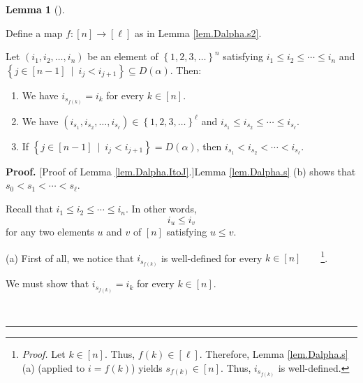 \documentclass[numbers=enddot,12pt,final,onecolumn,notitlepage,abstracton]{scrartcl}
\theoremstyle{definition}
\newtheorem{lem}[theo]{Lemma}
\newenvironment{lemma}[1][]
{\begin{lem}[#1]\begin{leftbar}}
{\end{leftbar}\end{lem}}
\newenvironment{proof}[1][Proof]{\noindent\textbf{#1.} }{\ \rule{0.5em}{0.5em}}
\newenvironment{verlong}{}{}
\begin{document}
\begin{verlong}
\begin{footnotesize}
\begin{lemma}
Define a map $f:\left[  n\right]  \rightarrow\left[  \ell\right]  $ as in
Lemma \ref{lem.Dalpha.s2}.

Let $\left(  i_{1},i_{2},\ldots,i_{n}\right)  $ be an element of $\left\{
1,2,3,\ldots\right\}  ^{n}$ satisfying $i_{1}\leq i_{2}\leq\cdots\leq i_{n}$
and $\left\{  j\in\left[  n-1\right]  \ \mid\ i_{j}<i_{j+1}\right\}  \subseteq
D\left(  \alpha\right)  $. Then:

\begin{enumerate}
\item[(a)] We have $i_{s_{f\left(  k\right)  }}=i_{k}$ for every $k\in\left[
n\right]  $.

\item[(b)] We have $\left(  i_{s_{1}},i_{s_{2}},\ldots,i_{s_{\ell}}\right)
\in\left\{  1,2,3,\ldots\right\}  ^{\ell}$ and $i_{s_{1}}\leq i_{s_{2}}%
\leq\cdots\leq i_{s_{\ell}}$.

\item[(c)] If $\left\{  j\in\left[  n-1\right]  \ \mid\ i_{j}<i_{j+1}\right\}
=D\left(  \alpha\right)  $, then $i_{s_{1}}<i_{s_{2}}<\cdots<i_{s_{\ell}}$.
\end{enumerate}
\end{lemma}

\begin{proof}
[Proof of Lemma \ref{lem.Dalpha.ItoJ}.]Lemma \ref{lem.Dalpha.s} (b) shows that
$s_{0}<s_{1}<\cdots<s_{\ell}$.

Recall that $i_{1}\leq i_{2}\leq\cdots\leq i_{n}$. In other words,%
\begin{equation}
i_{u}\leq i_{v} \label{pf.lem.Dalpha.ItoJ.rise}%
\end{equation}
for any two elements $u$ and $v$ of $\left[  n\right]  $ satisfying $u\leq v$.

(a) First of all, we notice that $i_{s_{f\left(  k\right)  }}$ is well-defined
for every $k\in\left[  n\right]  $\ \ \ \ \footnote{\textit{Proof.} Let
$k\in\left[  n\right]  $. Thus, $f\left(  k\right)  \in\left[  \ell\right]  $.
Therefore, Lemma \ref{lem.Dalpha.s} (a) (applied to $i=f\left(  k\right)  $)
yields $s_{f\left(  k\right)  }\in\left[  n\right]  $. Thus, $i_{s_{f\left(
k\right)  }}$ is well-defined.}.

We must show that $i_{s_{f\left(  k\right)  }}=i_{k}$ for every $k\in\left[
n\right]  $.


\end{proof}
\end{footnotesize}
\end{verlong}
\end{document}
